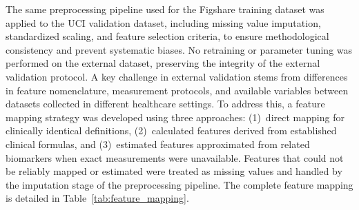 The same preprocessing pipeline used for the Figshare training dataset was applied to the UCI validation dataset, including missing value imputation, standardized scaling, and feature selection criteria, to ensure methodological consistency and prevent systematic biases. No retraining or parameter tuning was performed on the external dataset, preserving the integrity of the external validation protocol. A key challenge in external validation stems from differences in feature nomenclature, measurement protocols, and available variables between datasets collected in different healthcare settings. To address this, a feature mapping strategy was developed using three approaches: (1)~direct mapping for clinically identical definitions, (2)~calculated features derived from established clinical formulas, and (3)~estimated features approximated from related biomarkers when exact measurements were unavailable. Features that could not be reliably mapped or estimated were treated as missing values and handled by the imputation stage of the preprocessing pipeline. The complete feature mapping is detailed in Table~\ref{tab:feature_mapping}.

